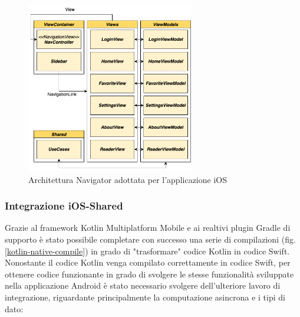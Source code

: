 \begin{figure}[H]
\centering
    \includegraphics[width=0.65\textwidth]{img/navigator-arch-ios.png}
    \caption{Architettura Navigator adottata per l'applicazione iOS}
    \label{iosarchapp}
\end{figure}

\subsubsection*{Integrazione iOS-Shared}
\label{integrazione-ios-shared}
Grazie al framework Kotlin Multiplatform Mobile e ai realtivi plugin Gradle di supporto è stato possibile completare con successo una serie di compilazioni (fig. \ref{kotlin-native-compile}) in grado di "trasformare" codice Kotlin in codice Swift. Nonostante il codice Kotlin venga compilato correttamente in codice Swift, per ottenere codice funzionante in grado di svolgere le stesse funzionalità sviluppate nella applicazione Android è stato necessario svolgere dell'ulteriore lavoro di integrazione, riguardante principalmente la computazione asincrona e i tipi di dato:

